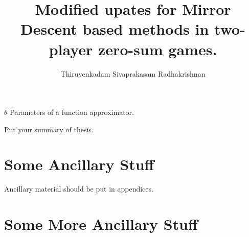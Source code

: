 \documentclass{uicthesi}
\begin{document}

\title{Modified upates for Mirror Descent based methods in two-player zero-sum games.}
\author{Thiruvenkadam Sivaprakasam Radhakrishnan}
\pdegrees{}
 \maketitle


\tableofcontents \listoftables \listoffigures
\listofabbreviations \begin{list} {} {\setlength {\labelwidth}{1in} \setlength{\leftmargin}{1.5in}
		\setlength{\labelsep}{.5in} \setlength{\rightmargin}{\leftmargin}} \item[$\theta$\hfill] Parameters
		of a function approximator.
\end{list}

\summary
Put your summary of thesis.









% 
% 

\appendices
\newpage
\appendix

\chapter{Some Ancillary Stuff}

Ancillary material should be put in appendices.

\chapter{Some More Ancillary Stuff}



\bibformb

\newpage
\end{document}
